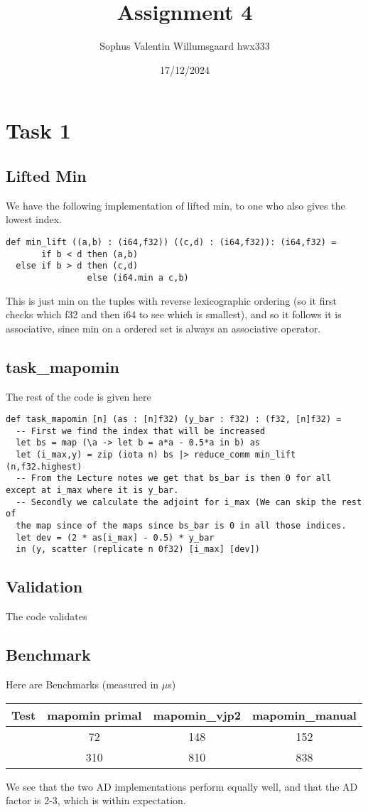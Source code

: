 \documentclass[a4paper,12pt]{article}
\begin{document}
\title{Assignment 4}
\author{Sophus Valentin Willumsgaard hwx333}
\date{17/12/2024}
\maketitle
\section*{Task 1}
\subsection*{Lifted Min}
We have the following implementation of lifted min, to one who also gives
the lowest index.
\begin{lstlisting}
def min_lift ((a,b) : (i64,f32)) ((c,d) : (i64,f32)): (i64,f32) =
       if b < d then (a,b)
  else if b > d then (c,d)
                else (i64.min a c,b)
\end{lstlisting}
This is  just min on the tuples with reverse lexicographic ordering
(so it first checks which f32 and then i64 to see which is smallest),
and so it follows it is associative,
since min on a ordered set is always
an associative operator.
\subsection*{task\_mapomin}
The rest of the code is given here
\begin{lstlisting}
def task_mapomin [n] (as : [n]f32) (y_bar : f32) : (f32, [n]f32) =
  -- First we find the index that will be increased
  let bs = map (\a -> let b = a*a - 0.5*a in b) as
  let (i_max,y) = zip (iota n) bs |> reduce_comm min_lift (n,f32.highest)
  -- From the Lecture notes we get that bs_bar is then 0 for all except at i_max where it is y_bar.
  -- Secondly we calculate the adjoint for i_max (We can skip the rest of
  the map since of the maps since bs_bar is 0 in all those indices.
  let dev = (2 * as[i_max] - 0.5) * y_bar
  in (y, scatter (replicate n 0f32) [i_max] [dev])
\end{lstlisting}
\subsection*{Validation}
The code validates
\subsection*{Benchmark}
Here are Benchmarks (measured in \(\mu\)s)
\begin{center}
	\begin{tabular}{|c|c|c|c|}
		Test       & mapomin primal & mapomin\_vjp2 & mapomin\_manual \\
		\hline
		[10000000] & 72             & 148           & 152             \\
		\hline
		[10000000] & 310            & 810           & 838             \\
	\end{tabular}
\end{center}
We see that the two AD implementations perform equally well, and that the AD
factor is 2-3, which is within expectation.
\end{document}
